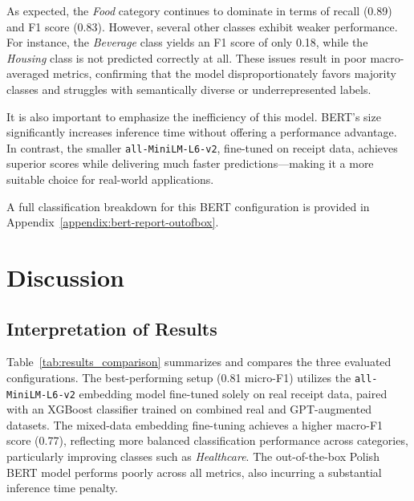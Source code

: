 \documentclass{SGGW-thesis-EN}
\begin{document}
As expected, the \emph{Food} category continues to dominate in terms of recall (0.89) and F1 score (0.83). However, several other classes exhibit  
weaker performance. For instance, the \emph{Beverage} class yields an F1 score of only 0.18, while the \emph{Housing} class is not predicted  
correctly at all. These issues result in poor macro-averaged metrics, confirming that the model disproportionately favors majority classes and  
struggles with semantically diverse or underrepresented labels.

It is also important to emphasize the inefficiency of this model. BERT’s size significantly increases inference time without offering a  
performance advantage. In contrast, the smaller \texttt{all-MiniLM-L6-v2}, fine-tuned on receipt data, achieves superior scores  
 while delivering much faster predictions—making it a more suitable choice for real-world applications.

A full classification breakdown for this BERT configuration is provided in Appendix~\ref{appendix:bert-report-outofbox}.


\chapter{Discussion}

\section{Interpretation of Results}

Table~\ref{tab:results_comparison} summarizes and compares the three evaluated
configurations. The best-performing setup (0.81 micro-F1) utilizes the 
\texttt{all-MiniLM-L6-v2} embedding model fine-tuned solely on real receipt data, 
paired with an XGBoost classifier trained on combined real and GPT-augmented 
datasets. The mixed-data embedding fine-tuning achieves a higher macro-F1 score 
(0.77), reflecting more balanced classification performance across categories, 
particularly improving classes such as \emph{Healthcare}. The out-of-the-box Polish 
BERT model performs poorly across all metrics, also incurring a substantial inference 
time penalty.
\end{document}
